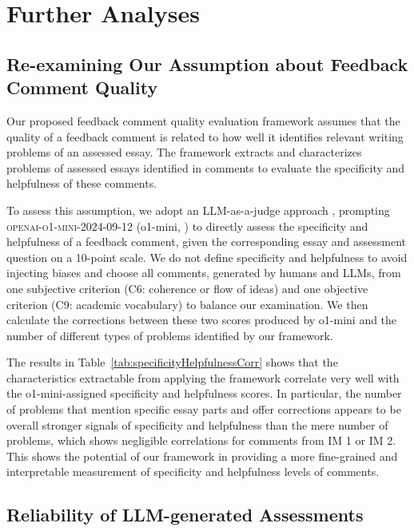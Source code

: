 \section{Further Analyses\label{sec:furtherAnalyses}} 





\subsection{Re-examining Our Assumption about Feedback Comment Quality} 

Our proposed feedback comment quality evaluation framework assumes that the quality of a feedback comment is related to how well it identifies relevant writing problems of an assessed essay. The framework extracts and characterizes problems of assessed essays identified in comments to evaluate the specificity and helpfulness of these comments.


To assess this assumption, we adopt an LLM-as-a-judge approach \cite{zheng2023judgingllmasajudge}, prompting \textsc{openai-o1-mini-2024-09-12} (o1-mini, \citealp{openai2024openaio1card}) to directly assess the specificity and helpfulness of a feedback comment, given the corresponding essay and assessment question on a 10-point scale. We do not define specificity and helpfulness to avoid injecting biases and choose all comments, generated by humans and LLMs, from one subjective criterion (C6: coherence or flow of ideas) and one objective criterion (C9: academic vocabulary) to balance our examination. We then calculate the corrections between these two scores produced by o1-mini and the number of different types of problems identified by our framework. 

The results in Table~\ref{tab:specificityHelpfulnessCorr} shows that the characteristics extractable from applying the framework correlate very well with the o1-mini-assigned specificity and helpfulness scores. In particular, the number of problems that mention specific essay parts and offer corrections appears to be overall stronger signals of specificity and helpfulness than the mere number of problems, which shows negligible correlations for comments from IM 1 or IM 2. This shows the potential of our framework in providing a more fine-grained and interpretable measurement of specificity and helpfulness levels of comments.





\subsection{Reliability of LLM-generated Assessments} 

